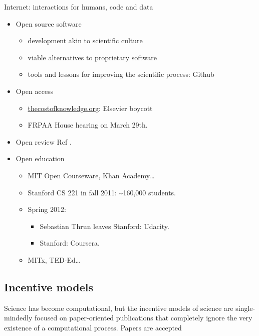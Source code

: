 \documentclass[ChapterTOCs,krantz2]{krantz} %
\begin{document}
Internet: interactions for humans, code and data

\begin{itemize}
\item Open source software

\begin{itemize}
\item development akin to scientific culture
\item viable alternatives to proprietary software
\item tools and lessons for improving the scientific process: Github
\end{itemize}

\item Open access

\begin{itemize}
\item \url{thecostofknowledge.org}: Elsevier boycott
\item FRPAA House hearing on March 29th.
\end{itemize}

\item Open review
Ref \cite{10.3389/fncom.2012.00018}.

\item Open education

\begin{itemize}
\item MIT Open Courseware, Khan Academy\ldots
\item Stanford CS 221 in fall 2011: \textasciitilde{}160,000 students.
\item Spring 2012:

\begin{itemize}
\item Sebastian Thrun leaves Stanford: Udacity.
\item Stanford: Coursera.
\end{itemize}
\item MITx, TED-Ed\ldots
\end{itemize}
\end{itemize}

\subsection{Incentive models}

Science has become computational, but the incentive models of science
are single-mindedly focused on paper-oriented publications that completely
ignore the very existence of a computational process. Papers are accepted 
\end{document}
